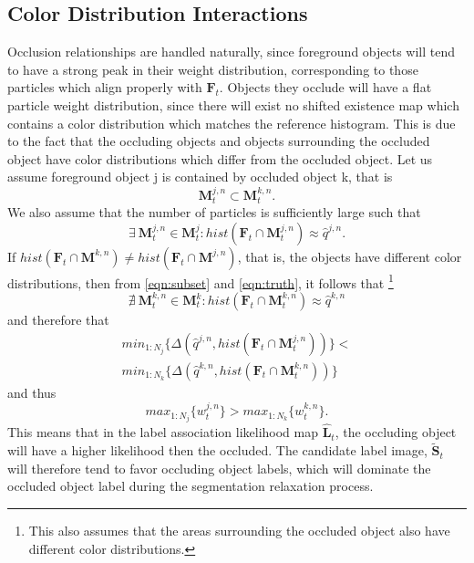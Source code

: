 \subsection{Color Distribution Interactions}
Occlusion relationships are handled naturally, since foreground objects will tend to have a strong peak in their weight distribution, corresponding to those particles which align properly with $\mathbf{F}_t$. Objects they occlude will have a flat particle weight distribution, since there will exist no shifted existence map which contains a color distribution which matches the reference histogram. This is due to the fact that the occluding objects and objects surrounding the occluded object have color distributions which differ from the occluded object. Let us assume foreground object j is contained by occluded object k, that is
\begin{equation}
\label{eqn:subset}
\mathbf{M}^{j,n}_t \subset \mathbf{M}^{k,n}_t .
\end{equation}
We also assume that the number of particles is sufficiently large such that
\begin{equation}
\label{eqn:truth}
\exists~\mathbf{M}^{j,n}_t \in \mathbf{M}^{j}_t : hist(\mathbf{F}_{t} \cap \mathbf{M}^{j,n}_t) \approx \hat{q}^{j,n}.
\end{equation}
If $hist(\mathbf{F}_{t} \cap \mathbf{M}^{k,n}) \neq hist(\mathbf{F}_{t} \cap \mathbf{M}^{j,n})$, that is, the objects have different color distributions, then from \eqref{eqn:subset} and \eqref{eqn:truth}, it follows that \footnote{This also assumes that the areas surrounding the occluded object also have different color distributions.}
\begin{equation}
\label{eqn:notruth}
\nexists~\mathbf{M}^{k,n}_t \in \mathbf{M}^{k}_t : hist(\mathbf{F}_{t} \cap \mathbf{M}^{k,n}_t) \approx \hat{q}^{k,n}
\end{equation}
and therefore that 
\begin{eqnarray}
min_{1:N_j} \{ \Delta(\mathit{\hat{q}^{j,n}},hist(\mathbf{F}_{t} \cap \mathbf{M}^{j,n}_t) )\} < \nonumber \\
min_{1:N_k} \{ \Delta(\mathit{\hat{q}^{k,n}},hist(\mathbf{F}_{t} \cap \mathbf{M}^{k,n}_t) )\}
\end{eqnarray}
and thus
\begin{equation}
max_{1:N_j}\{w^{j,n}_t\} > max_{1:N_k}\{w^{k,n}_t\}.
\end{equation}
This means that in the label association likelihood map $\mathbf{\hat{L}}_{t}$, the occluding object will have a higher likelihood then the occluded. The candidate label image, $\tilde{\mathbf{S}}_{t}$ will therefore tend to favor occluding object labels, which will dominate the occluded object label during the segmentation relaxation process.

